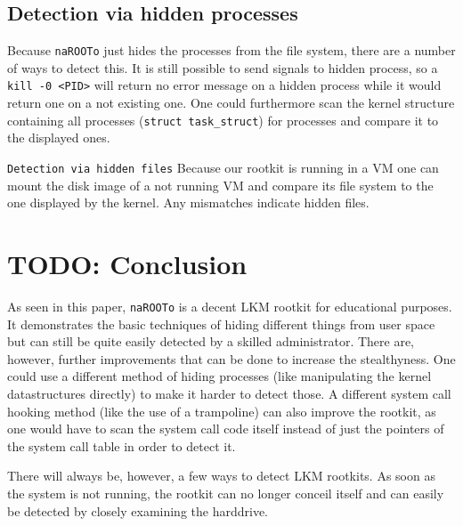 \documentclass[10pt, letterpaper]{scrartcl}
\begin{document}
\subsection{Detection via hidden processes}
Because \texttt{naROOTo} just hides the processes from the file system, there are a number of ways to detect this.
It is still possible to send signals to hidden process, so a \texttt{kill -0 <PID>} will return no error message on a hidden process while it would return one on a not existing one.
One could furthermore scan the kernel structure containing all processes (\texttt{struct task\_struct}) for processes and compare it to the displayed ones.

\texttt{Detection via hidden files}
Because our rootkit is running in a VM one can mount the disk image of a not running VM and compare its file system to the one displayed by the kernel. 
Any mismatches indicate hidden files.


\section{TODO: Conclusion}
As seen in this paper, \texttt{naROOTo} is a decent LKM rootkit for educational purposes.
It demonstrates the basic techniques of hiding different things from user space but can still be quite easily detected by a skilled administrator.
There are, however, further improvements that can be done to increase the stealthyness.
One could use a different method of hiding processes (like manipulating the kernel datastructures directly) to make it harder to detect those.
A different system call hooking method (like the use of a trampoline) can also improve the rootkit, as one would have to scan the system call code itself instead of just the pointers of the system call table in order to detect it.

There will always be, however, a few ways to detect LKM rootkits. As soon as the system is not running, the rootkit can no longer conceil itself and can easily be detected by closely examining the harddrive.
\end{document}
